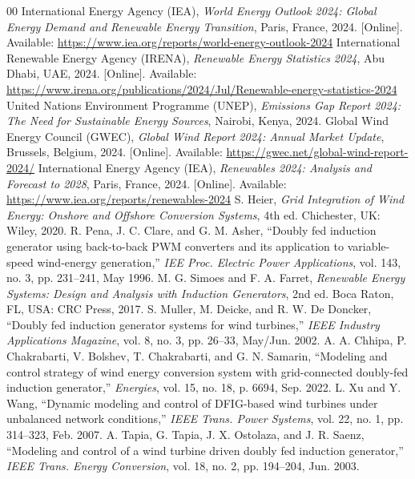 \documentclass[conference]{IEEEtran}
\begin{document}
\begin{thebibliography}{00}
 International Energy Agency (IEA), \textit{World Energy Outlook 2024: Global Energy Demand and Renewable Energy Transition}, Paris, France, 2024. [Online]. Available: \url{https://www.iea.org/reports/world-energy-outlook-2024}
 International Renewable Energy Agency (IRENA), \textit{Renewable Energy Statistics 2024}, Abu Dhabi, UAE, 2024. [Online]. Available: \url{https://www.irena.org/publications/2024/Jul/Renewable-energy-statistics-2024}
 United Nations Environment Programme (UNEP), \textit{Emissions Gap Report 2024: The Need for Sustainable Energy Sources}, Nairobi, Kenya, 2024.
 Global Wind Energy Council (GWEC), \textit{Global Wind Report 2024: Annual Market Update}, Brussels, Belgium, 2024. [Online]. Available: \url{https://gwec.net/global-wind-report-2024/}
 International Energy Agency (IEA), \textit{Renewables 2024: Analysis and Forecast to 2028}, Paris, France, 2024. [Online]. Available: \url{https://www.iea.org/reports/renewables-2024}
 S. Heier, \textit{Grid Integration of Wind Energy: Onshore and Offshore Conversion Systems}, 4th ed. Chichester, UK: Wiley, 2020.
 R. Pena, J. C. Clare, and G. M. Asher, ``Doubly fed induction generator using back-to-back PWM converters and its application to variable-speed wind-energy generation,'' \textit{IEE Proc. Electric Power Applications}, vol. 143, no. 3, pp. 231--241, May 1996.
 M. G. Simoes and F. A. Farret, \textit{Renewable Energy Systems: Design and Analysis with Induction Generators}, 2nd ed. Boca Raton, FL, USA: CRC Press, 2017.
 S. Muller, M. Deicke, and R. W. De Doncker, ``Doubly fed induction generator systems for wind turbines,'' \textit{IEEE Industry Applications Magazine}, vol. 8, no. 3, pp. 26--33, May/Jun. 2002.
 A. A. Chhipa, P. Chakrabarti, V. Bolshev, T. Chakrabarti, and G. N. Samarin, ``Modeling and control strategy of wind energy conversion system with grid-connected doubly-fed induction generator,'' \textit{Energies}, vol. 15, no. 18, p. 6694, Sep. 2022.
 L. Xu and Y. Wang, ``Dynamic modeling and control of DFIG-based wind turbines under unbalanced network conditions,'' \textit{IEEE Trans. Power Systems}, vol. 22, no. 1, pp. 314--323, Feb. 2007.
 A. Tapia, G. Tapia, J. X. Ostolaza, and J. R. Saenz, ``Modeling and control of a wind turbine driven doubly fed induction generator,'' \textit{IEEE Trans. Energy Conversion}, vol. 18, no. 2, pp. 194--204, Jun. 2003.

\end{thebibliography}
\end{document}
